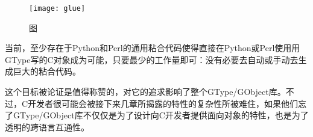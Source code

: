 \begin{figure}[h]
\begin{center}
	\texttt{[image: glue]}
	\caption{图}
\end{center}
\end{figure}

当前，至少存在于Python和Perl的通用粘合代码使得直接在Python或Perl使用用GType写的C对象成为可能，只要最少的工作量即可：没有必要去自动或手动去生成巨大的粘合代码。

这个目标被论证是值得称赞的，对它的追求影响了整个GType/GObject库。不过，C开发者很可能会被接下来几章所揭露的特性的复杂性所被难住，如果他们忘了GType/GObject库不仅仅是为了设计向C开发者提供面向对象的特性，也是为了透明的跨语言互通性。
